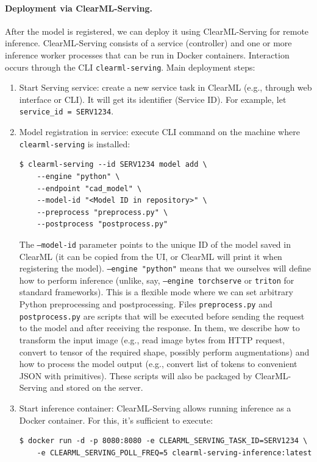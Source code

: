 \documentclass{article}
\begin{document}
\paragraph{Deployment via ClearML-Serving.} After the model is registered, we can deploy it using ClearML-Serving for remote inference. ClearML-Serving consists of a service (controller) and one or more inference worker processes that can be run in Docker containers. Interaction occurs through the CLI \texttt{clearml-serving}. Main deployment steps:
\begin{enumerate}
\item Start Serving service: create a new service task in ClearML (e.g., through web interface or CLI). It will get its identifier (Service ID). For example, let \texttt{service_id = SERV1234}.
\item Model registration in service: execute CLI command on the machine where \texttt{clearml-serving} is installed:
\begin{verbatim}
$ clearml-serving --id SERV1234 model add \
    --engine "python" \
    --endpoint "cad_model" \
    --model-id "<Model ID in repository>" \
    --preprocess "preprocess.py" \
    --postprocess "postprocess.py"
\end{verbatim}
The \texttt{--model-id} parameter points to the unique ID of the model saved in ClearML (it can be copied from the UI, or ClearML will print it when registering the model). \texttt{--engine "python"} means that we ourselves will define how to perform inference (unlike, say, \texttt{--engine torchserve} or \texttt{triton} for standard frameworks). This is a flexible mode where we can set arbitrary Python preprocessing and postprocessing. Files \texttt{preprocess.py} and \texttt{postprocess.py} are scripts that will be executed before sending the request to the model and after receiving the response. In them, we describe how to transform the input image (e.g., read image bytes from HTTP request, convert to tensor of the required shape, possibly perform augmentations) and how to process the model output (e.g., convert list of tokens to convenient JSON with primitives). These scripts will also be packaged by ClearML-Serving and stored on the server.
\item Start inference container: ClearML-Serving allows running inference as a Docker container. For this, it's sufficient to execute:
\begin{verbatim}
$ docker run -d -p 8080:8080 -e CLEARML_SERVING_TASK_ID=SERV1234 \
    -e CLEARML_SERVING_POLL_FREQ=5 clearml-serving-inference:latest

\end{verbatim}
\end{enumerate}
\end{document}
